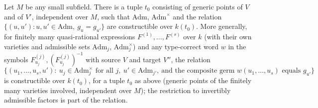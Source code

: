 \begin{lemma}\label{lem:adm-constructible}
Let $M$ be any small subfield.  There is a tuple $t_0$ consisting of generic points of
$V$ and of $V'$, independent over $M$, such that $\mathrm{Adm}$, $\mathrm{Adm}^\times$ and the
relation $\{(u,u'):u,u'\in\mathrm{Adm},\ g_u=g_{u'}\}$ are constructible over $k(t_0)$.  More
generally, for finitely many quasi-rational expressions $F^{(1)},\dots,F^{(s)}$ over $k$
(with their own varieties and admissible sets $\mathrm{Adm}_j$, $\mathrm{Adm}^\times_j$) and
any type-correct word $w$ in the symbols $F^{(j)}_{u_j},(F^{(j)}_{u_j})^{-1}$ with source $V$
and target $V''$, the relation
\[
  \bigl\{(u_1,\dots,u_s,u'):\ u_j\in\mathrm{Adm}^\times_j\text{ for all }j,\ u'\in\mathrm{Adm}_{j'},\
  \text{and the composite germ } w(u_1,\dots,u_s)\text{ equals } g_{u'}\bigr\}
\]
is constructible over $k(t_0)$, for a tuple $t_0$ as above (generic points of the finitely
many varieties involved, independent over $M$); the restriction to invertibly admissible
factors is part of the relation.
\end{lemma}
